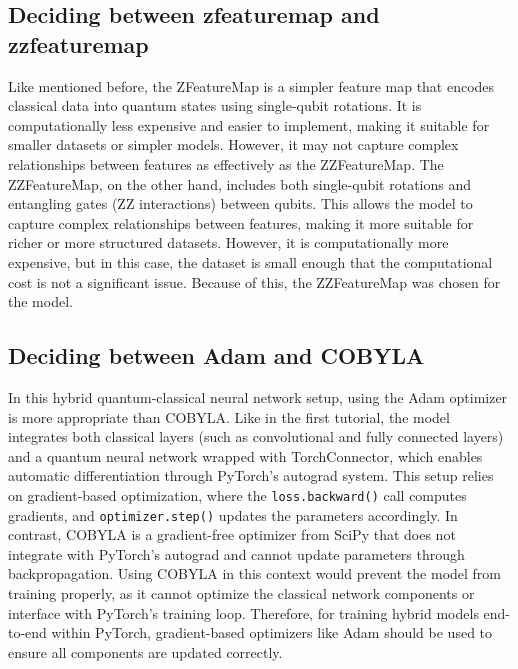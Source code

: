 \documentclass[conference]{IEEEtran}
\begin{document}
\subsection*{\fontsize{12}{16}\selectfont Deciding between zfeaturemap and zzfeaturemap}

\noindent
Like mentioned before, the ZFeatureMap is a simpler feature map that encodes classical data into quantum states using single-qubit rotations. It is computationally less expensive and easier to implement, making it suitable for smaller datasets or simpler models. However, it may not capture complex relationships between features as effectively as the ZZFeatureMap.
The ZZFeatureMap, on the other hand, includes both single-qubit rotations and entangling gates (ZZ interactions) between qubits. This allows the model to capture complex relationships between features, making it more suitable for richer or more structured datasets. However, it is computationally more expensive, but in this case, the dataset is small enough that the computational cost is not a significant issue. Because of this, the ZZFeatureMap was chosen for the model.\\


\subsection*{\fontsize{12}{16}\selectfont Deciding between Adam and COBYLA}
\noindent
In this hybrid quantum-classical neural network setup, using the Adam optimizer is more appropriate than COBYLA. Like in the first tutorial, the model integrates both classical layers (such as convolutional and fully connected layers) and a quantum neural network wrapped with TorchConnector, which enables automatic differentiation through PyTorch's autograd system. This setup relies on gradient-based optimization, where the \texttt{loss.backward()} call computes gradients, and \texttt{optimizer.step()} updates the parameters accordingly. In contrast, COBYLA is a gradient-free optimizer from SciPy \cite{scipy_cobyla} that does not integrate with PyTorch's autograd and cannot update parameters through backpropagation. Using COBYLA in this context would prevent the model from training properly, as it cannot optimize the classical network components or interface with PyTorch's training loop. Therefore, for training hybrid models end-to-end within PyTorch, gradient-based optimizers like Adam should be used to ensure all components are updated correctly.
\end{document}
